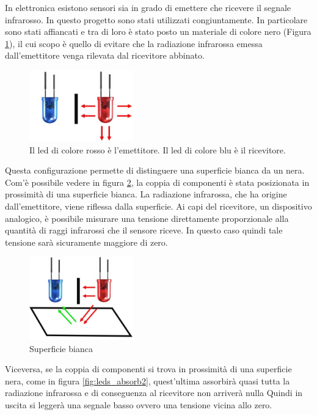 \documentclass[twoside,twocolumn]{article}
\begin{document}
In elettronica esistono sensori sia in grado di emettere che ricevere il segnale infrarosso. In questo progetto sono stati utilizzati congiuntamente. In particolare sono stati affiancati e tra di loro è stato posto un materiale di colore nero (Figura \ref{fig:coppia}), il cui scopo è quello di evitare che la radiazione infrarossa emessa dall'emettitore venga rilevata dal ricevitore abbinato.

\begin{figure}[h]
	\centering
	\includegraphics[width=0.4\textwidth]{immagini/coppia}
	\caption{Il led di colore rosso è l'emettitore. Il led di colore blu è il ricevitore.}
	\label{fig:coppia}
\end{figure}

Questa configurazione permette di distinguere una superficie bianca da un nera. Com'è possibile vedere in figura \ref{fig:leds_absorb1}, la coppia di componenti è stata posizionata in prossimità di una superficie bianca. La radiazione infrarossa, che ha origine dall'emettitore, viene riflessa dalla superficie. Ai capi del ricevitore, un dispositivo analogico, è possibile misurare una tensione direttamente proporzionale alla quantità di raggi infrarossi che il sensore riceve. In questo caso quindi tale tensione sarà sicuramente maggiore di zero.

\begin{figure}[h]
	\centering
	\includegraphics[width=0.4\textwidth]{immagini/leds_absorb1}
	\caption{Superficie bianca}
	\label{fig:leds_absorb1}
\end{figure}

\newpage
Viceversa, se la coppia di componenti si trova in prossimità di una superficie nera, come in figura  \ref{fig:leds_absorb2}, quest'ultima assorbirà quasi tutta la radiazione infrarossa e di conseguenza al ricevitore non arriverà nulla Quindi in uscita si leggerà una segnale basso ovvero una tensione vicina allo zero.
\end{document}
